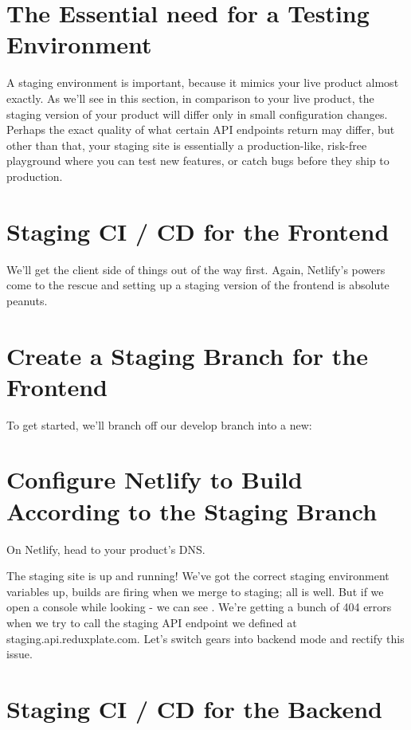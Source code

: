 \documentclass[a4paper,
                             oneside,
                             BCOR1.0cm,
                             DIV11,
                             parskip=full,
                             11pt]{scrbook}
\begin{document}
\section{The Essential need for a Testing Environment}\label{sec:titles}

A staging environment is important, because it mimics your live product almost exactly. As we'll see in this section, in comparison to your live product, the staging version of your product will differ only in small configuration changes. Perhaps the exact quality of what certain API endpoints return may differ, but other than that, your staging site is essentially a production-like, risk-free playground where you can test new features, or catch bugs before they ship to production.

\section{Staging CI / CD for the Frontend}\label{sec:titles}

We'll get the client side of things out of the way first. Again, Netlify's powers come to the rescue and setting up a staging version of the frontend is absolute peanuts. 

\section{Create a Staging Branch for the Frontend}\label{sec:titles}

To get started, we'll branch off our develop branch into a new:

\section{Configure Netlify to Build According to the Staging Branch}\label{sec:titles}

On Netlify, head to your product's DNS.

The staging site is up and running! We've got the correct staging environment variables up, builds are firing when we merge to staging; all is well. But if we open a console while looking - we can see . We're getting a bunch of 404 errors when we try to call the staging API endpoint we defined at staging.api.reduxplate.com. Let's switch gears into backend mode and rectify this issue.

\section{Staging CI / CD for the Backend}\label{sec:titles}
\end{document}
